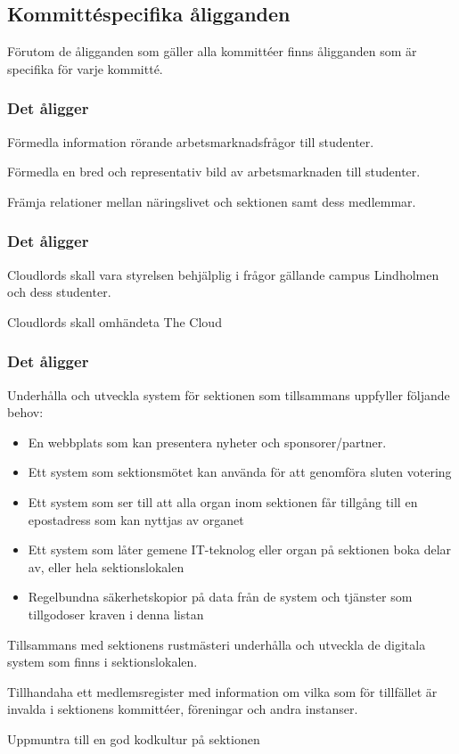 \subsection{Kommittéspecifika åligganden}
Förutom de åligganden som gäller alla kommittéer finns åligganden som är specifika för varje kommitté.

\subsubsection{Det åligger \ARMIT{}}
\begin{att}
	\item Förmedla information rörande arbetsmarknadsfrågor till studenter.
	\item Förmedla en bred och representativ bild av arbetsmarknaden till studenter.
	\item Främja relationer mellan näringslivet och sektionen samt dess medlemmar.
\end{att}

\subsubsection{Det åligger \CLOUDLORDS}
\begin{att}
	\item Cloudlords skall vara styrelsen behjälplig i frågor gällande campus Lindholmen och dess studenter.
    \item Cloudlords skall omhändeta The Cloud
\end{att}

\subsubsection{Det åligger \DIGIT}
\begin{att}
	\item Underhålla och utveckla system för sektionen som tillsammans uppfyller följande behov:
	\begin{itemize}
		\item En webbplats som kan presentera nyheter och sponsorer/partner.
		\item Ett system som sektionsmötet kan använda för att genomföra sluten votering
		\item Ett system som ser till att alla organ inom sektionen får tillgång till en epostadress som kan nyttjas av organet
		\item Ett system som låter gemene IT-teknolog eller organ på sektionen boka delar av, eller hela sektionslokalen
		\item Regelbundna säkerhetskopior på data från de system och tjänster som tillgodoser kraven i denna listan
	\end{itemize}
	\item Tillsammans med sektionens rustmästeri underhålla och utveckla de digitala system som finns i sektionslokalen.
	\item Tillhandaha ett medlemsregister med information om vilka som för tillfället är invalda i sektionens kommittéer, föreningar och andra instanser.
	\item Uppmuntra till en god kodkultur på sektionen
\end{att}

